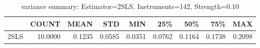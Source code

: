 \begin{table}[ht]
\centering
\caption{variance summary: Estimator=2SLS, Instruments=142, Strength=0.10}
\begin{tabular}{lrrrrrrrr}
\toprule
 & COUNT & MEAN & STD & MIN & 25\% & 50\% & 75\% & MAX \\
\midrule
2SLS & 10.0000 & 0.1235 & 0.0585 & 0.0351 & 0.0762 & 0.1164 & 0.1738 & 0.2098 \\
\bottomrule
\end{tabular}
\end{table}
